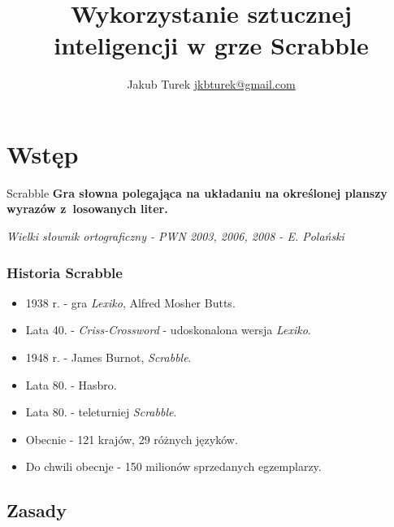 \documentclass[10pt,a4paper]{beamer}
\author{\texorpdfstring{Jakub Turek \newline \href{mailto:jkbturek@gmail.com}{ jkbturek@gmail.com }}{Jakub Turek}}
\title{Wykorzystanie sztucznej inteligencji w grze Scrabble}
\institute{Wydział Elektroniki i Technik Informacyjnych}
\begin{document}
\begin{frame}
	\titlepage
\end{frame}

\section{Wstęp}

\begin{frame}
	\begin{block}{Scrabble}
		\textbf{Gra słowna polegająca na układaniu na określonej planszy wyrazów z~losowanych liter.}
		
		\vspace{10mm}
		
		\emph{Wielki słownik ortograficzny - PWN 2003, 2006, 2008 - E. Polański}
	\end{block}
\end{frame}

\begin{frame}
	\frametitle{Historia Scrabble}
	
	\begin{itemize}
		\item 1938 r. - gra \emph{Lexiko}, Alfred Mosher Butts.
		\item Lata 40. - \emph{Criss-Crossword} - udoskonalona wersja \emph{Lexiko}.
		\item 1948 r. - James Burnot, \emph{Scrabble}.
		\item Lata 80. - Hasbro.
		\item Lata 80. - teleturniej \emph{Scrabble}.
		\item Obecnie - 121 krajów, 29 różnych języków.
		\item Do chwili obecnje - 150 milionów sprzedanych egzemplarzy.
	\end{itemize}
\end{frame}

\subsection{Zasady}
\end{document}
